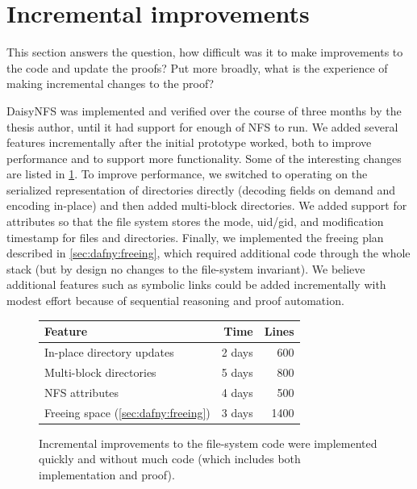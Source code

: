 \section{Incremental improvements}
\label{sec:eval:incremental}

This section answers the question, how difficult was it to make improvements to
the code and update the proofs? Put more broadly, what is the experience of
making incremental changes to the proof?

DaisyNFS was implemented and verified over the course of three months by the
thesis author, until it had support for enough of NFS to run. We
added several features incrementally after the initial prototype
worked, both to improve performance and to support more
functionality. Some of the interesting changes are listed in
\cref{fig:features}.  To improve performance, we switched to
operating on the serialized representation of directories directly
(decoding fields on demand and encoding in-place) and then added
multi-block directories.  We added support for attributes so that the file
system stores the mode, uid/gid, and modification timestamp for files and directories.
Finally, we implemented the freeing plan described
in \cref{sec:dafny:freeing}, which required additional code through the
whole stack (but by design no changes to the file-system invariant).
We believe additional features such as symbolic links
could be added incrementally with modest effort because
of sequential reasoning and proof automation.

\begin{figure}[ht!]
\begin{center}
\begin{tabular}{lrr}
  \toprule
  \textbf{Feature} & \textbf{Time} & \textbf{Lines} \\
  \midrule
  In-place directory updates & 2 days & 600\\
  Multi-block directories & 5 days & 800 \\
  NFS attributes & 4 days & 500 \\
  Freeing space (\cref{sec:dafny:freeing}) & 3 days & 1400\\
  \bottomrule
\end{tabular}
\end{center}
\tightenspace
\caption[Effort for incremental improvements to the file system]%
{Incremental improvements to the file-system code were implemented
  quickly and without much code (which includes both implementation and proof).}
\label{fig:features}
\end{figure}

